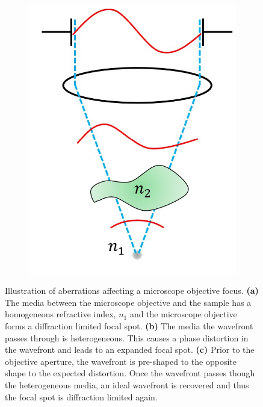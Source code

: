 \begin{figure}[h]
\begin{subfigure}[t]{0.3\textwidth}
		\includegraphics[width=\linewidth]{images/wavefront_focus_corrected.jpg}
		\caption{}
		\label{fig:wavefront_focus_corrected}
	\end{subfigure}
	\caption[Illustration of aberrations affecting a microscope
	objective focus.]{Illustration of aberrations affecting a
		microscope objective focus. \textbf{(a)} The media between
		the microscope objective and the sample has a homogeneous refractive index, $n_{1}$ and the microscope objective forms a diffraction limited focal spot. \textbf{(b)} The media the wavefront passes through is heterogeneous. This causes a phase distortion in the wavefront and leads to an expanded focal spot. \textbf{(c)} Prior to the objective aperture, the wavefront is pre-shaped to the opposite shape to the expected distortion. Once the wavefront passes though the heterogeneous media, an ideal wavefront is recovered and thus the focal spot is diffraction limited again.}
	\label{fig:wavefront_focus}
\end{figure}

